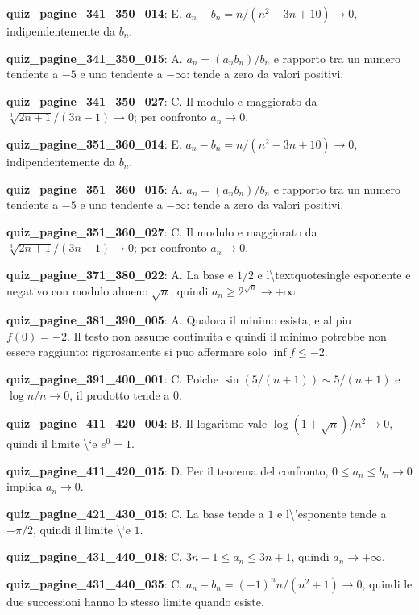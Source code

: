 \documentclass[11pt,a4paper]{article}
\newcounter{quiz}
\begin{document}
\noindent\textbf{quiz\_pagine\_341\_350\_014}: E. $a_n-b_n=n/(n^2-3n+10)\to0$, indipendentemente da $b_n$.\par\medskip
\noindent\textbf{quiz\_pagine\_341\_350\_015}: A. $a_n=(a_nb_n)/b_n$ e rapporto tra un numero tendente a $-5$ e uno tendente a $-\infty$: tende a zero da valori positivi.\par\medskip
\noindent\textbf{quiz\_pagine\_341\_350\_027}: C. Il modulo e maggiorato da $\sqrt[3]{2n+1}/(3n-1)\to0$; per confronto $a_n\to0$.\par\medskip
\noindent\textbf{quiz\_pagine\_351\_360\_014}: E. $a_n-b_n=n/(n^2-3n+10)\to0$, indipendentemente da $b_n$.\par\medskip
\noindent\textbf{quiz\_pagine\_351\_360\_015}: A. $a_n=(a_nb_n)/b_n$ e rapporto tra un numero tendente a $-5$ e uno tendente a $-\infty$: tende a zero da valori positivi.\par\medskip
\noindent\textbf{quiz\_pagine\_351\_360\_027}: C. Il modulo e maggiorato da $\sqrt[3]{2n+1}/(3n-1)\to0$; per confronto $a_n\to0$.\par\medskip
\noindent\textbf{quiz\_pagine\_371\_380\_022}: A. La base e $1/2$ e l\textbackslash{}textquotesingle esponente e negativo con modulo almeno $\sqrt n$, quindi $a_n\geq2^{\sqrt n}\to+\infty$.\par\medskip
\noindent\textbf{quiz\_pagine\_381\_390\_005}: A. Qualora il minimo esista, e al piu $f(0)=-2$. Il testo non assume continuita e quindi il minimo potrebbe non essere raggiunto: rigorosamente si puo affermare solo $\inf f\leq-2$.\par\medskip
\noindent\textbf{quiz\_pagine\_391\_400\_001}: C. Poiche $\sin(5/(n+1))\sim5/(n+1)$ e $\log n/n\to0$, il prodotto tende a $0$.\par\medskip
\noindent\textbf{quiz\_pagine\_411\_420\_004}: B. Il logaritmo vale $\log(1+\sqrt n)/n^2\to0$, quindi il limite \textbackslash{}`e $e^0=1$.\par\medskip
\noindent\textbf{quiz\_pagine\_411\_420\_015}: D. Per il teorema del confronto, $0\leq a_n\leq b_n\to0$ implica $a_n\to0$.\par\medskip
\noindent\textbf{quiz\_pagine\_421\_430\_015}: C. La base tende a $1$ e l\textbackslash{}'esponente tende a $-\pi/2$, quindi il limite \textbackslash{}`e $1$.\par\medskip
\noindent\textbf{quiz\_pagine\_431\_440\_018}: C. $3n-1\leq a_n\leq3n+1$, quindi $a_n\to+\infty$.\par\medskip
\noindent\textbf{quiz\_pagine\_431\_440\_035}: C. $a_n-b_n=(-1)^nn/(n^2+1)\to0$, quindi le due successioni hanno lo stesso limite quando esiste.\par\medskip
\end{document}
